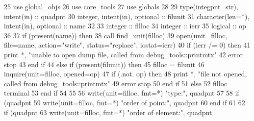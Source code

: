 \begin{DoxyCode}
25       \textcolor{keywordtype}{use }global_objs
26       \textcolor{keywordtype}{use }core_tools
27       \textcolor{keywordtype}{use }globals
28       
29       \textcolor{keywordtype}{type}(integpnt_str), \textcolor{keywordtype}{intent(in)} :: quadpnt
30       \textcolor{keywordtype}{integer}, \textcolor{keywordtype}{intent(in)}, \textcolor{keywordtype}{optional} :: filunit
31       \textcolor{keywordtype}{character(len=*)}, \textcolor{keywordtype}{intent(in)}, \textcolor{keywordtype}{optional} :: name
32       
33       \textcolor{keywordtype}{integer} :: filloc
34       \textcolor{keywordtype}{integer} :: ierr
35       \textcolor{keywordtype}{logical} :: op   
36       
37       \textcolor{keywordflow}{if} (\textcolor{keyword}{present}(name)) \textcolor{keywordflow}{then}
38         \textcolor{keyword}{call }find_unit(filloc)
39         \textcolor{keyword}{open}(unit=filloc, file=name, action=\textcolor{stringliteral}{"write"}, status=\textcolor{stringliteral}{"replace"}, iostat\textcolor{comment}{=ierr)}
40 \textcolor{comment}{        }\textcolor{keywordflow}{if} (ierr /= 0) \textcolor{keywordflow}{then}
41           print *, \textcolor{stringliteral}{"unable to open dump file, called from debug\_tools::printmtx"}
42           error stop
43 \textcolor{keywordflow}{        end if}
44       \textcolor{keywordflow}{else} \textcolor{keywordflow}{if} (\textcolor{keyword}{present}(filunit)) \textcolor{keywordflow}{then}
45         filloc = filunit
46         \textcolor{keyword}{inquire}(unit=filloc, opened=op)
47         \textcolor{keywordflow}{if} (.not. op) \textcolor{keywordflow}{then}
48           print *, \textcolor{stringliteral}{"file not opened, called from debug\_tools::printmtx"}
49           error stop
50 \textcolor{keywordflow}{        end if}
51       \textcolor{keywordflow}{else}
52         filloc = terminal
53 \textcolor{keywordflow}{      end if}
54       
55       
56       \textcolor{keyword}{write}(unit=filloc, fmt=*) \textcolor{stringliteral}{"type:"}, quadpnt%
57       
58       \textcolor{keywordflow}{if} (quadpnt%
59         \textcolor{keyword}{write}(unit=filloc, fmt=*) \textcolor{stringliteral}{"order of point:"}, quadpnt%
60 \textcolor{keywordflow}{      end if}
61       
62       \textcolor{keywordflow}{if} (quadpnt%
63         \textcolor{keyword}{write}(unit=filloc, fmt=*) \textcolor{stringliteral}{"order of element:"}, quadpnt%

\end{DoxyCode}
